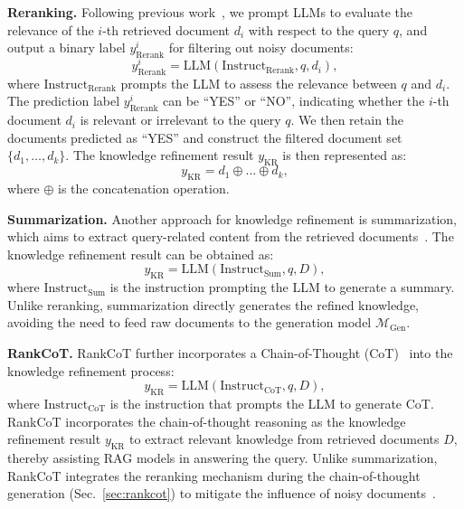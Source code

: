 \textbf{Reranking.} Following previous work~\cite{asai2024selfrag}, we prompt LLMs to evaluate the relevance of the $i$-th retrieved document $d_i$ with respect to the query $q$, and output a binary label $y_\text{Rerank}^i$ for filtering out noisy documents:
\begin{equation}
\label{eq:reranking}
    y_\text{Rerank}^i = \text{LLM} (\text{Instruct}_\text{Rerank}, q, d_i),
\end{equation}
where $\text{Instruct}_\text{Rerank}$ prompts the LLM to assess the relevance between $q$ and $d_i$. The prediction label $y_\text{Rerank}^i$ can be ``YES'' or ``NO'', indicating whether the $i$-th document $d_i$ is relevant or irrelevant to the query $q$. We then retain the documents predicted as ``YES'' and construct the filtered document set $\{d_1, \dots, d_k\}$. The knowledge refinement result $y_\text{KR}$ is then represented as:
\begin{equation}
    y_\text{KR} = d_1 \oplus \dots \oplus d_k,
\end{equation}
where $\oplus$ is the concatenation operation.

\textbf{Summarization.} Another approach for knowledge refinement is summarization, which aims to extract query-related content from the retrieved documents~\cite{vig2021exploring}. The knowledge refinement result can be obtained as:
\begin{equation}
    y_\text{KR} = \text{LLM} (\text{Instruct}_\text{Sum}, q, D),
\end{equation}
where $\text{Instruct}_\text{Sum}$ is the instruction prompting the LLM to generate a summary. Unlike reranking, summarization directly generates the refined knowledge, avoiding the need to feed raw documents to the generation model $\mathcal{M}_\text{Gen}$.

\textbf{RankCoT.} RankCoT further incorporates a Chain-of-Thought (CoT)~\cite{wei2022chain} into the knowledge refinement process:
\begin{equation}
    y_\text{KR} = \text{LLM} (\text{Instruct}_\text{CoT}, q, D),
\end{equation}
where $\text{Instruct}_\text{CoT}$ is the instruction that prompts the LLM to generate CoT. RankCoT incorporates the chain-of-thought reasoning as the knowledge refinement result $y_\text{KR}$ to extract relevant knowledge from retrieved documents $D$, thereby assisting RAG models in answering the query.  Unlike summarization, RankCoT integrates the reranking mechanism during the chain-of-thought generation (Sec.~\ref{sec:rankcot}) to mitigate the influence of noisy documents~\cite{liu2024lost, xie2024adaptive}. 






